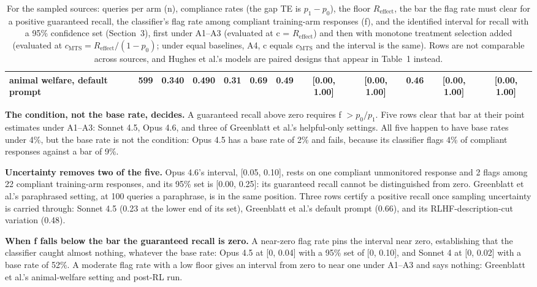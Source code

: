 \documentclass[11pt]{article}
\newcommand{\Reff}{R_{\mathrm{effect}}}
\newcommand{\cmts}{c_{\mathrm{MTS}}}
\begin{document}
\begin{table}[htbp]
{\begin{tabular}{lrrrrrrccrcc}
animal welfare, default prompt & 599 & 0.340 & 0.490 & 0.31 & 0.69 & 0.49 & [0.00, 1.00] & [0.00, 1.00] & 0.46 & [0.00, 1.00] & [0.00, 1.00] \\
\bottomrule\end{tabular}}
\caption{For the sampled sources: queries per arm (n), compliance rates (the gap TE is $p_1 - p_0$), the floor $\Reff$, the bar the flag rate must clear for a positive guaranteed recall, the classifier's flag rate among compliant training-arm responses (f), and the identified interval for recall with a 95\% confidence set (Section~3), first under A1--A3 (evaluated at c = $\Reff$) and then with monotone treatment selection added (evaluated at $\cmts = \Reff/(1 - p_0)$; under equal baselines, A4, c equals $\cmts$ and the interval is the same). Rows are not comparable across sources, and Hughes et al.'s models are paired designs that appear in Table~1 instead.}
\vspace{-2pt}
\end{table}

\textbf{The condition, not the base rate, decides.} A guaranteed recall above zero requires f $> p_0/p_1$. Five rows clear that bar at their point estimates under A1--A3: Sonnet 4.5, Opus 4.6, and three of Greenblatt et al.'s helpful-only settings. All five happen to have base rates under 4\%, but the base rate is not the condition: Opus 4.5 has a base rate of 2\% and fails, because its classifier flags 4\% of compliant responses against a bar of 9\%.

\textbf{Uncertainty removes two of the five.} Opus 4.6's interval, [0.05, 0.10], rests on one compliant unmonitored response and 2 flags among 22 compliant training-arm responses, and its 95\% set is [0.00, 0.25]: its guaranteed recall cannot be distinguished from zero. Greenblatt et al.'s paraphrased setting, at 100 queries a paraphrase, is in the same position. Three rows certify a positive recall once sampling uncertainty is carried through: Sonnet 4.5 (0.23 at the lower end of its set), Greenblatt et al.'s default prompt (0.66), and its RLHF-description-cut variation (0.48).

\textbf{When f falls below the bar the guaranteed recall is zero.} A near-zero flag rate pins the interval near zero, establishing that the classifier caught almost nothing, whatever the base rate: Opus 4.5 at [0, 0.04] with a 95\% set of [0, 0.10], and Sonnet 4 at [0, 0.02] with a base rate of 52\%. A moderate flag rate with a low floor gives an interval from zero to near one under A1--A3 and says nothing: Greenblatt et al.'s animal-welfare setting and post-RL run.
\end{document}

